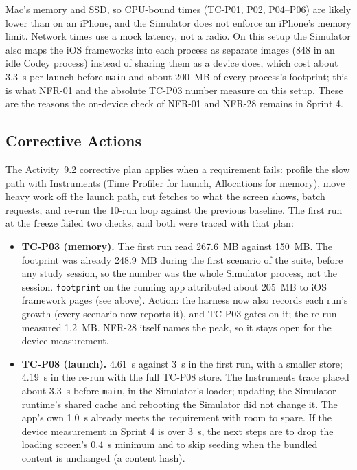 \documentclass[12pt,letterpaper]{article}
\begin{document}
\begin{itemize}
        Mac's memory and SSD, so CPU-bound times (TC-P01, P02, P04--P06) are likely
        lower than on an iPhone, and the Simulator does not enforce an iPhone's memory
        limit. Network times use a mock latency, not a radio. On this setup the
        Simulator also maps the iOS frameworks into each process as separate images
        (848 in an idle Codey process) instead of sharing them as a device does,
        which cost about 3.3~s per launch before \texttt{main} and about 200~MB of
        every process's footprint; this is what NFR-01 and the absolute TC-P03
        number measure on this setup. These are the reasons the on-device check of
        NFR-01 and NFR-28 remains in Sprint 4.
\end{itemize}

\subsection{Corrective Actions}
The Activity~9.2 corrective plan applies when a requirement fails: profile the slow
path with Instruments (Time Profiler for launch, Allocations for memory), move heavy
work off the launch path, cut fetches to what the screen shows, batch requests, and
re-run the 10-run loop against the previous baseline. The first run at the freeze
failed two checks, and both were traced with that plan:
\begin{itemize}
  \item \textbf{TC-P03 (memory).} The first run read 267.6~MB against 150~MB. The
        footprint was already 248.9~MB during the first scenario of the suite, before
        any study session, so the number was the whole Simulator process, not the
        session. \texttt{footprint} on the running app attributed about 205~MB to iOS
        framework pages (see above). Action: the harness now also records each run's
        growth (every scenario now reports it), and TC-P03 gates on it; the re-run
        measured 1.2~MB. NFR-28 itself names the peak, so it stays open for the
        device measurement.
  \item \textbf{TC-P08 (launch).} 4.61~s against 3~s in the first run, with a smaller
        store; 4.19~s in the re-run with the full TC-P08 store. The Instruments trace placed
        about 3.3~s before \texttt{main}, in the Simulator's loader; updating the
        Simulator runtime's shared cache and rebooting the Simulator did not change
        it. The app's own 1.0~s already meets the requirement with room to spare.
        If the device measurement in Sprint 4 is over 3~s, the next steps are to
        drop the loading screen's 0.4~s minimum and to skip seeding when the bundled
        content is unchanged (a content hash).
\end{itemize}
\end{document}
